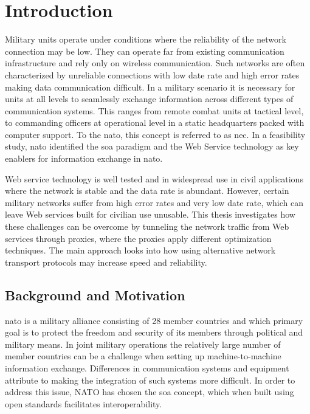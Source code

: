 \chapter{Introduction}

Military units operate under conditions where the reliability of the network
connection may be low. They can operate far from existing communication
infrastructure and rely only on wireless communication. Such networks are often
characterized by unreliable connections with low date rate and high error rates
making data communication difficult. In a military scenario it is necessary for
units at all levels to seamlessly exchange information across different types of
communication systems. This ranges from remote combat units at tactical level,
to commanding officers at operational level in a static headquarters packed with
computer support. To the \gls{nato}, this concept is referred to as \gls{nec}.
In a feasibility study, \gls{nato} identified the \gls{soa} paradigm and the Web
Service technology as key enablers for information exchange in
\gls{nato}\cite{nnec-study}.

Web service technology is well tested and in widespread use in civil
applications where the network is stable and the data rate is abundant. However,
certain military networks suffer from high error rates and very low date rate,
which can leave Web services built for civilian use unusable. This thesis
investigates how these challenges can be overcome by tunneling the network
traffic from Web services through proxies, where the proxies apply different
optimization techniques. The main approach looks into how using alternative
network transport protocols may increase speed and reliability.

\section{Background and Motivation}

\gls{nato} is a military alliance consisting of 28 member countries
\cite{nato-homepage-member-countries} and which primary goal is to protect the
freedom and security of its members through political and military means. In
joint military operations the relatively large number of member countries can be
a challenge when setting up machine-to-machine information exchange. Differences
in communication systems and equipment attribute to making the integration of
such systems more difficult. In order to address this issue, NATO has chosen the
\gls{soa} concept, which when built using open standards facilitates
interoperability\cite{nnec-study}.

